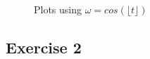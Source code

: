\documentclass[12pt,a4paper]{article}
\begin{document}
\begin{enumerate}[label=(\alph*)]
\begin{figure}[h]
	      	\qquad
	      	\caption{Plots using $\omega=cos(\lfloor t \rfloor)$}%
	      	\label{fig:floor}%
	      \end{figure}
\end{enumerate}
\subsection*{Exercise 2}
\end{document}

